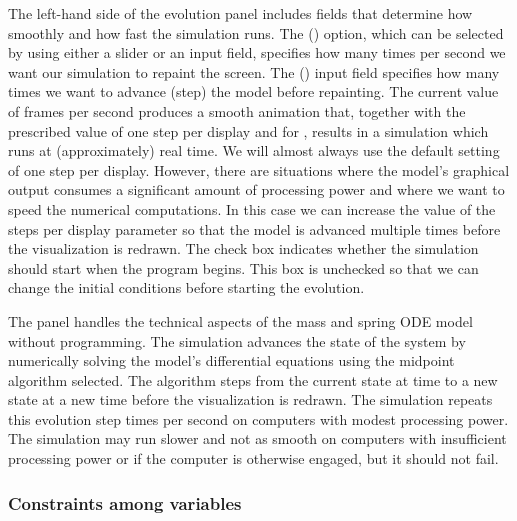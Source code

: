 The left-hand side of the evolution panel includes fields that determine how smoothly and how fast the simulation runs.
The  () option, which can be selected by using either a slider or an input field, specifies how many times per second we want our simulation to repaint the screen. The  () input field
specifies how many times we want to advance (step) the model before repainting. The current value of  frames per second produces a smooth animation that, together with the prescribed value of one step per display and  for
, results in a simulation which runs  at (approximately) real time. We will almost always use the default
setting of one step per display. However, there are situations where the model's graphical output consumes a
significant amount of processing power and where we want to speed the numerical computations. In this case we can increase the value of the
steps per display parameter so that the model is advanced multiple times before the visualization is redrawn.
The  check box indicates whether the simulation should start when the program begins. This box
is unchecked so that we can change the initial conditions before starting the evolution.

The  panel handles the technical aspects of the mass and spring ODE model without programming.  The
simulation advances the state of the system by numerically solving the model's differential equations using the
midpoint algorithm selected. The algorithm steps from the current state at time  to a new state at a new time
 before the visualization is redrawn. The simulation repeats this evolution step  times per second
on computers with modest processing power. The simulation may run slower and not as smooth on computers with
insufficient processing power or if the computer is otherwise engaged, but it should not fail.

\subsubsection{Constraints among variables}\label{section:02InspectingConstraints}

